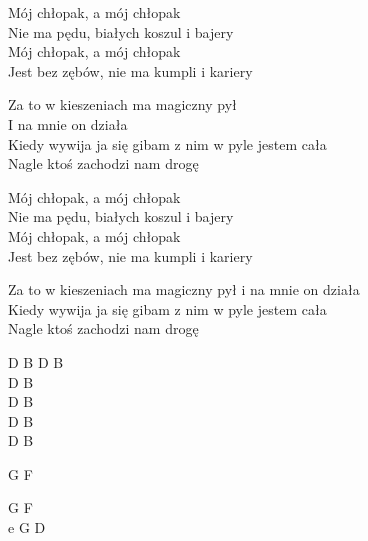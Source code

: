 \begin{text}
    \chordfill
    Mój chłopak, a mój chłopak\\
    Nie ma pędu, białych koszul i bajery\\
    Mój chłopak, a mój chłopak\\
    Jest bez zębów, nie ma kumpli i kariery

    Za to w kieszeniach ma magiczny pył\\
    I na mnie on działa\\
    Kiedy wywija ja się gibam z nim w pyle jestem cała\\
    Nagle ktoś zachodzi nam drogę

    Mój chłopak, a mój chłopak\\
    Nie ma pędu, białych koszul i bajery\\
    Mój chłopak, a mój chłopak\\
    Jest bez zębów, nie ma kumpli i kariery

    Za to w kieszeniach ma magiczny pył i na mnie on działa\\
    Kiedy wywija ja się gibam z nim w pyle jestem cała\\
    Nagle ktoś zachodzi nam drogę
\end{text}
\begin{chord}
    D B D B\\
    D B\\
    D B\\
    D B\\
    D B

    G F

    G F\\
    e G D
\end{chord}